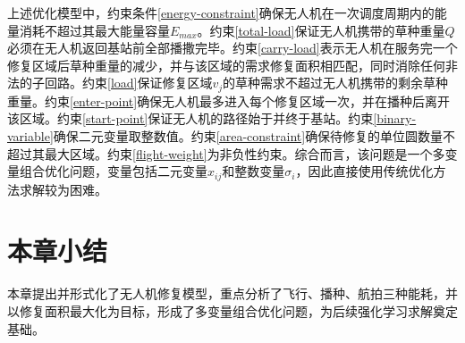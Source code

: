 \documentclass[AutoFakeBold]{LZUThesis}
\begin{document}
上述优化模型中，约束条件\eqref{energy-constraint}确保无人机在一次调度周期内的能量消耗不超过其最大能量容量$E_{max}$。约束\eqref{total-load}保证无人机携带的草种重量$Q$必须在无人机返回基站前全部播撒完毕。约束\eqref{carry-load}表示无人机在服务完一个修复区域后草种重量的减少，并与该区域的需求修复面积相匹配，同时消除任何非法的子回路。约束\eqref{load}保证修复区域$v_j$的草种需求不超过无人机携带的剩余草种重量。约束\eqref{enter-point}确保无人机最多进入每个修复区域一次，并在播种后离开该区域。约束\eqref{start-point}保证无人机的路径始于并终于基站。约束\eqref{binary-variable}确保二元变量取整数值。约束\eqref{area-constraint}确保待修复的单位圆数量不超过其最大区域。约束\eqref{flight-weight}为非负性约束。综合而言，该问题是一个多变量组合优化问题，变量包括二元变量$x_{ij}$和整数变量$\sigma_i$，因此直接使用传统优化方法求解较为困难。


\section{本章小结}
本章提出并形式化了无人机修复模型，重点分析了飞行、播种、航拍三种能耗，并以修复面积最大化为目标，形成了多变量组合优化问题，为后续强化学习求解奠定基础。

\end{document}

